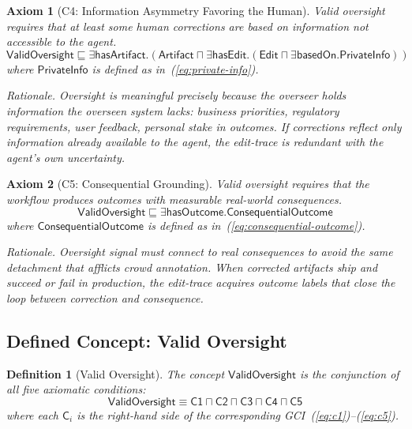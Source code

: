 \documentclass[11pt]{article}
\newtheorem{definition}{Definition}[section]
\newtheorem{axiom}{Axiom}[section]
\newcommand{\sqsub}{\sqsubseteq}
\begin{document}
\begin{axiom}[C4: Information Asymmetry Favoring the Human]
\label{ax:c4}
Valid oversight requires that at least some human corrections are based on information not accessible to the agent.
\begin{equation}
  \mathsf{ValidOversight} \sqsub
    \exists\mathsf{hasArtifact}.\left(
      \mathsf{Artifact} \sqcap \exists\mathsf{hasEdit}.\left(
        \mathsf{Edit} \sqcap \exists\mathsf{basedOn}.\mathsf{PrivateInfo}
      \right)
    \right)
  \label{eq:c4}
\end{equation}
where $\mathsf{PrivateInfo}$ is defined as in~(\ref{eq:private-info}).

\medskip\noindent
\emph{Rationale.}
Oversight is meaningful precisely because the overseer holds information the overseen system lacks: business priorities, regulatory requirements, user feedback, personal stake in outcomes.
If corrections reflect only information already available to the agent, the edit-trace is redundant with the agent's own uncertainty.
\end{axiom}

\begin{axiom}[C5: Consequential Grounding]
\label{ax:c5}
Valid oversight requires that the workflow produces outcomes with measurable real-world consequences.
\begin{equation}
  \mathsf{ValidOversight} \sqsub
    \exists\mathsf{hasOutcome}.\mathsf{ConsequentialOutcome}
  \label{eq:c5}
\end{equation}
where $\mathsf{ConsequentialOutcome}$ is defined as in~(\ref{eq:consequential-outcome}).

\medskip\noindent
\emph{Rationale.}
Oversight signal must connect to real consequences to avoid the same detachment that afflicts crowd annotation.
When corrected artifacts ship and succeed or fail in production, the edit-trace acquires outcome labels that close the loop between correction and consequence.
\end{axiom}

\subsection{Defined Concept: Valid Oversight}
\label{sec:valid-oversight}

\begin{definition}[Valid Oversight]
\label{def:valid-oversight}
The concept $\mathsf{ValidOversight}$ is the conjunction of all five axiomatic conditions:
\begin{equation}
\boxed{
  \mathsf{ValidOversight} \equiv
    \mathsf{C1} \sqcap \mathsf{C2} \sqcap \mathsf{C3} \sqcap \mathsf{C4} \sqcap \mathsf{C5}
}
\label{eq:valid-oversight}
\end{equation}
where each $\mathsf{C}_i$ is the right-hand side of the corresponding GCI~(\ref{eq:c1})--(\ref{eq:c5}).
\end{definition}
\end{document}
